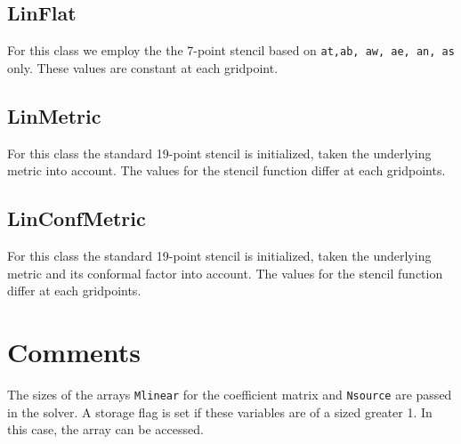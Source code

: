 \documentclass{article}
\begin{document}
\subsection{{\bf LinFlat}}
For this class we employ the the 7-point stencil based on {\tt at,ab,
aw, ae, an, as} only. These values are constant at each gridpoint.

\subsection{{\bf LinMetric}}
For this class the standard 19-point stencil is initialized, taken the 
underlying metric into account. The values for the stencil function
differ at each gridpoints.

\subsection{{\bf LinConfMetric}}
For this class the standard 19-point stencil is initialized, taken the 
underlying metric and its conformal factor into account. The values
for the stencil function differ at each gridpoints.

\section{Comments}
The sizes of the arrays {\tt Mlinear} for the coefficient matrix and
{\tt Nsource} are passed in the solver. A storage flag is set if these 
variables are of a sized greater 1. In this case, the array can be
accessed.


\end{document}
